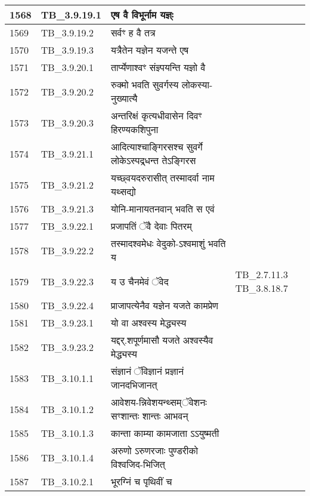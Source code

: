 \documentclass[17pt]{extarticle}
\begin{document}
\begin{longtable}{||p{0.4in}||p{0.9in}||p{4.0in}||p{0.9in}||}
        \hline
            1568 & TB\_3.9.19.1 & एष वै विभूर्नाम यज्ञ्ः &      \\
        \hline
            1569 & TB\_3.9.19.2 & सर्वꣳ ह वै तत्र &      \\
        \hline
            1570 & TB\_3.9.19.3 & यत्रैतेन यज्ञेन यजन्ते एष &      \\
        \hline
            1571 & TB\_3.9.20.1 & तार्प्येणाश्वꣳ संज्ञ्पयन्ति यज्ञो वै &      \\
        \hline
            1572 & TB\_3.9.20.2 & रुक्मो भवति सुवर्गस्य लोकस्या{-}नुख्यात्यै &      \\
        \hline
            1573 & TB\_3.9.20.3 & अन्तरिक्षं कृत्यधीवासेन दिवꣳ हिरण्यकशिपुना &      \\
        \hline
            1574 & TB\_3.9.21.1 & आदित्याश्चाङ्गिरसश्च सुवर्गे लोकेऽस्पद्र्धन्त तेऽङ्गिरस &      \\
        \hline
            1575 & TB\_3.9.21.2 & यच्छ्वयदरुरासीत् तस्मादर्वा नाम यथ्सद्यो &      \\
        \hline
            1576 & TB\_3.9.21.3 & योनि{-}मानायतनवान् भवति स एवं &      \\
        \hline
            1577 & TB\_3.9.22.1 & प्रजापतिं ॅवै देवाः पितरम् &      \\
        \hline
            1578 & TB\_3.9.22.2 & तस्मादश्वमेधः वेदुको{-}ऽश्वमाशुं भवति य &      \\
        \hline
            1579 & TB\_3.9.22.3 & य उ चैनमेवं ॅवेद & TB\_2.7.11.3 TB\_3.8.18.7        \\
        \hline
            1580 & TB\_3.9.22.4 & प्राजापत्येनैव यज्ञेन यजते कामप्रेण &      \\
        \hline
            1581 & TB\_3.9.23.1 & यो वा अश्वस्य मेद्ध्यस्य &      \\
        \hline
            1582 & TB\_3.9.23.2 & यद्दर्.शपूर्णमासौ यजते अश्वस्यैव मेद्ध्यस्य &      \\
        \hline
            1583 & TB\_3.10.1.1 & संज्ञानं ॅविज्ञानं प्रज्ञानं जानदभिजानत् &      \\
        \hline
            1584 & TB\_3.10.1.2 & आवेशय{-}न्निवेशयन्थ्सम्ॅवेशनः सꣳशान्तः शान्तः आभवन् &      \\
        \hline
            1585 & TB\_3.10.1.3 & कान्ता काम्या कामजाता ऽऽयुष्मती &      \\
        \hline
            1586 & TB\_3.10.1.4 & अरुणो ऽरुणरजाः पुण्डरीको विश्वजिद{-}भिजित् &      \\
        \hline
            1587 & TB\_3.10.2.1 & भूरग्निं च पृथिवीं च &      \\

\end{longtable}
\end{document}
